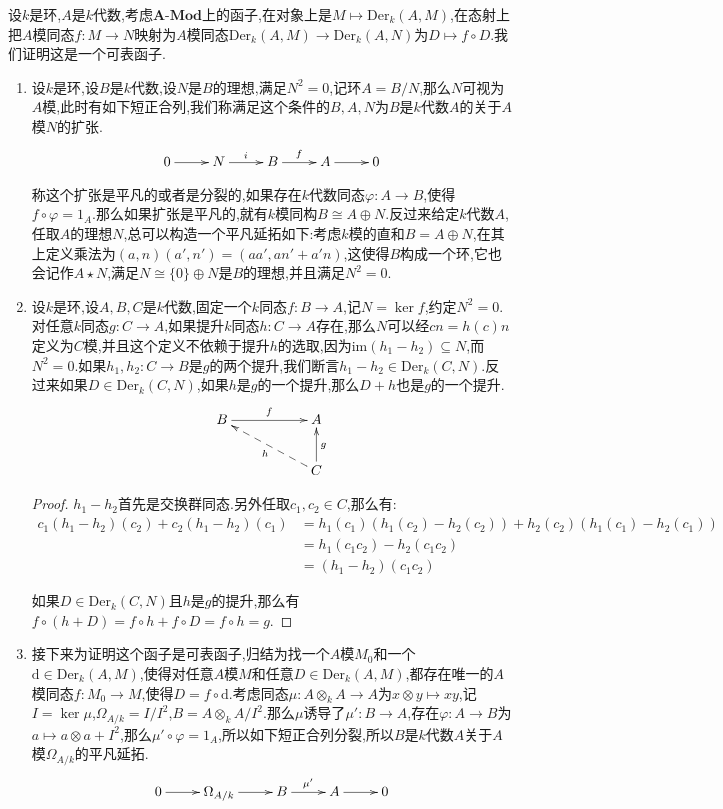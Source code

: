 设$k$是环,$A$是$k$代数,考虑$\textbf{A-Mod}$上的函子,在对象上是$M\mapsto\mathrm{Der}_k(A,M)$,在态射上把$A$模同态$f:M\to N$映射为$A$模同态$\mathrm{Der}_k(A,M)\to\mathrm{Der}_k(A,N)$为$D\mapsto f\circ D$.我们证明这是一个可表函子.
\begin{enumerate}
	\item 设$k$是环,设$B$是$k$代数,设$N$是$B$的理想,满足$N^2=0$,记环$A=B/N$,那么$N$可视为$A$模,此时有如下短正合列,我们称满足这个条件的$B,A,N$为$B$是$k$代数$A$的关于$A$模$N$的扩张.
	$$\xymatrix{0\ar[r]&N\ar[r]^i&B\ar[r]^f&A\ar[r]&0}$$
	
	称这个扩张是平凡的或者是分裂的,如果存在$k$代数同态$\varphi:A\to B$,使得$f\circ\varphi=1_A$.那么如果扩张是平凡的,就有$k$模同构$B\cong A\oplus N$.反过来给定$k$代数$A$,任取$A$的理想$N$,总可以构造一个平凡延拓如下:考虑$k$模的直和$B=A\oplus N$,在其上定义乘法为$(a,n)(a',n')=(aa',an'+a'n)$,这使得$B$构成一个环,它也会记作$A\star N$,满足$N\cong\{0\}\oplus N$是$B$的理想,并且满足$N^2=0$.
	\item 设$k$是环,设$A,B,C$是$k$代数,固定一个$k$同态$f:B\to A$,记$N=\ker f$,约定$N^2=0$.对任意$k$同态$g:C\to A$,如果提升$k$同态$h:C\to A$存在,那么$N$可以经$cn=h(c)n$定义为$C$模,并且这个定义不依赖于提升$h$的选取,因为$\mathrm{im}(h_1-h_2)\subseteq N$,而$N^2=0$.如果$h_1,h_2:C\to B$是$g$的两个提升,我们断言$h_1-h_2\in\mathrm{Der}_k(C,N)$.反过来如果$D\in\mathrm{Der}_k(C,N)$,如果$h$是$g$的一个提升,那么$D+h$也是$g$的一个提升.
	$$\xymatrix{B\ar[rr]^f&&A\\&&C\ar[u]_g\ar@{-->}[ull]^h}$$
	\begin{proof}
		
		$h_1-h_2$首先是交换群同态.另外任取$c_1,c_2\in C$,那么有:
		\begin{align*}
			c_1(h_1-h_2)(c_2)+c_2(h_1-h_2)(c_1)&=h_1(c_1)(h_1(c_2)-h_2(c_2))+h_2(c_2)(h_1(c_1)-h_2(c_1))\\&=h_1(c_1c_2)-h_2(c_1c_2)\\&=(h_1-h_2)(c_1c_2)
		\end{align*}
		
		如果$D\in\mathrm{Der}_k(C,N)$且$h$是$g$的提升,那么有$f\circ(h+D)=f\circ h+f\circ D=f\circ h=g$.
	\end{proof}
	\item 接下来为证明这个函子是可表函子,归结为找一个$A$模$M_0$和一个$\mathrm{d}\in\mathrm{Der}_k(A,M)$,使得对任意$A$模$M$和任意$D\in\mathrm{Der}_k(A,M)$,都存在唯一的$A$模同态$f:M_0\to M$,使得$D=f\circ\mathrm{d}$.考虑同态$\mu:A\otimes_kA\to A$为$x\otimes y\mapsto xy$,记$I=\ker\mu$,$\Omega_{A/k}=I/I^2$,$B=A\otimes_kA/I^2$.那么$\mu$诱导了$\mu':B\to A$,存在$\varphi:A\to B$为$a\mapsto a\otimes a+I^2$,那么$\mu'\circ\varphi=1_A$,所以如下短正合列分裂,所以$B$是$k$代数$A$关于$A$模$\Omega_{A/k}$的平凡延拓.
	$$\xymatrix{0\ar[r]&\Omega_{A/k}\ar[r]&B\ar[r]^{\mu'}&A\ar[r]&0}$$
	

\end{enumerate}
